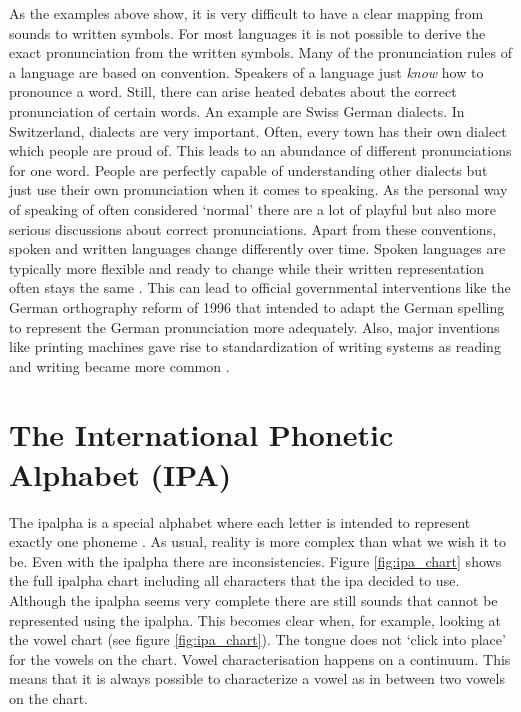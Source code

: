 As the examples above show, it is very difficult to have a clear mapping from sounds to written symbols. For most languages it is not possible to derive the exact pronunciation from the written symbols. Many of the pronunciation rules of a language are based on convention. Speakers of a language just \textit{know} how to pronounce a word. Still, there can arise heated debates about the correct pronunciation of certain words. An example are Swiss German dialects. In Switzerland, dialects are very important. Often, every town has their own dialect which people are proud of. This leads to an abundance of different pronunciations for one word. People are perfectly capable of understanding other dialects but just use their own pronunciation when it comes to speaking. As the personal way of speaking of often considered `normal' there are a lot of playful but also more serious discussions about correct pronunciations. Apart from these conventions, spoken and written languages change differently over time. Spoken languages are typically more flexible and ready to change while their written representation often stays the same \citep{unicode-lingu}. This can lead to official governmental interventions like the German orthography reform of 1996 that intended to adapt the German spelling to represent the German pronunciation more adequately. Also, major inventions like printing machines gave rise to standardization of writing systems as reading and writing became more common \citep{writing-systems}.

\section{The International Phonetic Alphabet (IPA)}
\label{sec:ipa}
The \ac{ipalpha} is a special alphabet where each letter is intended to represent exactly one phoneme  \citep{writing-systems, Intro.2007}. As usual, reality is more complex than what we wish it to be. Even with the \ac{ipalpha} there are inconsistencies. Figure \ref{fig:ipa_chart} shows the full \ac{ipalpha} chart including all characters that the \ac{ipa} decided to use. Although the \ac{ipalpha} seems very complete there are still sounds that cannot be represented using the \ac{ipalpha}. This becomes clear when, for example, looking at the vowel chart (see figure \ref{fig:ipa_chart}). The tongue does not `click into place' for the vowels on the chart. Vowel characterisation happens on a continuum. This means that it is always possible to characterize a vowel as in between two vowels on the chart.


